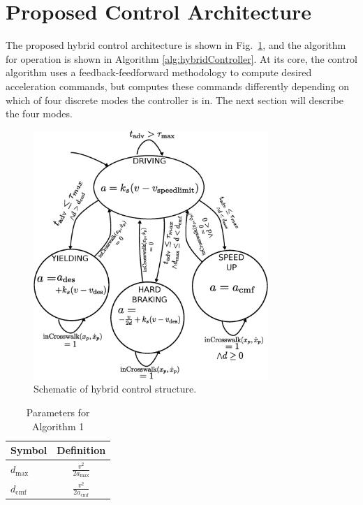 \documentclass[letterpaper, 10 pt, conference]{ieeeconf} %
\begin{document}
\section{Proposed Control Architecture}

The proposed hybrid control architecture is shown in Fig.~\ref{fig:hybridController}, and the algorithm for operation is shown in Algorithm \ref{alg:hybridController}. At its core, the control algorithm uses a feedback-feedforward methodology to compute desired acceleration commands, but computes these commands differently depending on which of four discrete modes the controller is in. The next section will describe the four modes. 

\begin{figure}
\centering
\includegraphics[width=3.5in]{figures/stateDiagram2.eps}
\caption{Schematic of hybrid control structure.}
\label{fig:hybridController}
\end{figure}

\begin{table}[h]
\begin{center}
\caption{Parameters for Algorithm 1}\label{tb:params}
\begin{tabular}{lc}
Symbol & Definition \\\hline\hline
$d_\mathrm{max}$ & $\frac{v^2}{2a_\mathrm{max}}$ \\
$d_\mathrm{cmf}$ & $\frac{v^2}{2a_\mathrm{cmf}}$ \\\hline
\end{tabular}
\end{center}
\end{table}
\end{document}
